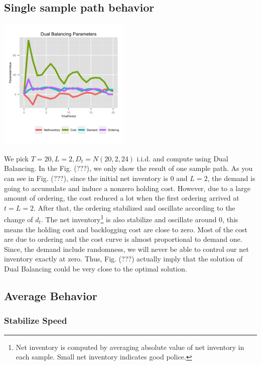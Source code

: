 \documentclass[twoside]{article}
\begin{document}
\begin{multicols}{2}
\subsection{Single sample path behavior}
  \includegraphics[width=2.5in]{figures/DualBalancingParameters.png}

We pick $T=20,L=2,D_t=N(20,2,24)$ i.i.d. and compute using Dual Balancing. In the Fig. (???), we only show the result of one sample path. As you can see in Fig. (???), since the initial net inventory is 0 and $L=2$, the demand is going to accumulate and induce a nonzero holding cost. However, due to a large amount of ordering, the cost reduced a lot when the first ordering arrived at $t=L=2$. After that, the ordering stabilized and oscillate according to the change of $d_t$. The net inventory\footnote{Net inventory is computed by averaging absolute value of net inventory in each sample. Small net inventory indicates good police.} is also stabilize and oscillate around 0, this means the holding cost and backlogging cost are close to zero. Most of the cost are due to ordering and the cost curve is almost proportional to demand one.\\
Since, the demand include randomness, we will never be able to control our net inventory exactly at zero. Thus, Fig. (???) actually imply that the solution of Dual Balancing could be very close to the optimal solution.
\subsection{Average Behavior}

\subsubsection{Stabilize Speed}


\end{multicols}
\end{document}
